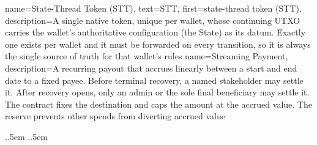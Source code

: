 {
    name=State-Thread Token (STT),
    text={STT},
    first={state-thread token (STT)},
    description={A single native token, unique per wallet, whose continuing UTXO carries the wallet's authoritative configuration (the State) as its datum. Exactly one exists per wallet and it must be forwarded on every transition, so it is always the single source of truth for that wallet's rules}
}
{
    name=Streaming Payment,
    description={A recurring payout that accrues linearly between a start and end date to a fixed payee. Before terminal recovery, a named stakeholder may settle it. After recovery opens, only an admin or the sole final beneficiary may settle it. The contract fixes the destination and caps the amount at the accrued value. The reserve prevents other spends from diverting accrued value}
}

\setlength {\marginparwidth }{4cm}
\hypersetup{pageanchor=false}%

\usepackage{amsmath,amsthm}
%
  {\sffamily\bfseries\color{brandnavy}}{.}{.5em}{}
%
  {\sffamily\bfseries\color{brandnavy}}{.}{.5em}{}
\theoremstyle{branddef}
\newtheorem{definition}{Definition}
\theoremstyle{brandplain}
\newtheorem{theorem}{Theorem}

\usetikzlibrary{matrix,fit,calc}
